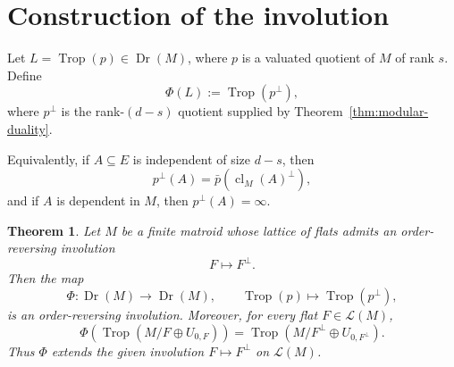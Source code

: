 \documentclass[11pt]{article}
\newcommand{\Trop}{\operatorname{Trop}}
\newcommand{\Dr}{\operatorname{Dr}}
\newcommand{\cl}{\operatorname{cl}}
\newcommand{\cL}{\mathcal L}
\theoremstyle{plain}
\newtheorem{theorem}{Theorem}[section]
\theoremstyle{definition}
\begin{document}
\section{Construction of the involution}

Let \(L=\Trop(p)\in \Dr(M)\), where \(p\) is a valuated quotient of \(M\) of rank \(s\).  Define
\[
   \Phi(L):=\Trop(p^\perp),
\]
where \(p^\perp\) is the rank-\((d-s)\) quotient supplied by Theorem~\ref{thm:modular-duality}.

Equivalently, if \(A\subseteq E\) is independent of size \(d-s\), then
\[
   p^\perp(A)=\bar p(\cl_M(A)^\perp),
\]
and if \(A\) is dependent in \(M\), then \(p^\perp(A)=\infty\).

\begin{theorem}\label{thm:main}
Let \(M\) be a finite matroid whose lattice of flats admits an order-reversing involution
\[
   F\longmapsto F^\perp.
\]
Then the map
\[
   \Phi:\Dr(M)\longrightarrow \Dr(M),\qquad
   \Trop(p)\longmapsto \Trop(p^\perp),
\]
is an order-reversing involution.  Moreover, for every flat \(F\in \cL(M)\),
\[
   \Phi\!\left(\Trop(M/F\oplus U_{0,F})\right)
   =
   \Trop(M/F^\perp\oplus U_{0,F^\perp}).
\]
Thus \(\Phi\) extends the given involution \(F\mapsto F^\perp\) on \(\cL(M)\).
\end{theorem}
\end{document}
